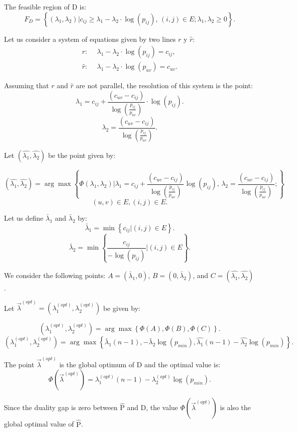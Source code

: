 The feasible region of $\mathrm{D}$ is:
\[F_{D}=\left\{(\lambda_{1},\lambda_{2})|c_{ij}\geq
\lambda_{1}-\lambda_{2}\cdot \log(p_{ij}),\, (i,j)\in E;
\lambda_{1},\lambda_{2}\geq 0 \right\}.\]

Let us consider a system of equations given by two lines $r$ y
$\hat{r}$:
\begin{align*}
  r:~        &~  \lambda_{1}-\lambda_{2}\cdot \log(p_{ij})=c_{ij}, \\
  \hat{r}:~  &~  \lambda_{1}-\lambda_{2}\cdot \log(p_{uv})=c_{uv}.
\end{align*}

Assuming that $r$ and $\hat{r}$ are not parallel, the resolution
of this system is the point:
\[\lambda_{1}=c_{ij}+\frac{(c_{uv}-c_{ij})}{\log(\frac{p_{ij}}{p_{uv}})}\cdot\log(p_{ij}).  \]
\[\lambda_{2}=\frac{(c_{uv}-c_{ij})}{\log(\frac{p_{ij}}{p_{uv}})}.  \]

Let $(\hat{\lambda_{1}},\hat{\lambda_{2}})$ be the point given by:

\[(\hat{\lambda_{1}},\hat{\lambda_{2}})=\arg\max\left\{\Phi(\lambda_{1},\lambda_{2})|\lambda_{1}=c_{ij}+\frac{(c_{uv}-c_{ij})}{\log(\frac{p_{ij}}{p_{uv}})}\log(p_{ij}),\,\lambda_{2}=\frac{(c_{uv}-c_{ij})}{\log(\frac{p_{ij}}{p_{uv}})};\right\}\]
\[(u,v)\in E, (i,j)\in E. \]

Let us define $\bar{\lambda}_{1}$ and $\bar{\lambda}_{2}$ by:
\[\bar{\lambda}_{1}=\min\left\{c_{ij}|(i,j)\in E \right\}. \]
\[\bar{\lambda}_{2}=\min\left\{\frac{c_{ij}}{-\log(p_{ij})}|(i,j)\in E \right\}. \]

We consider the following points: $A=(\bar{\lambda}_{1},0)$,
$B=(0,\bar{\lambda}_{2})$, and
$C=(\hat{\lambda_{1}},\hat{\lambda_{2}})$.

Let
$\vec{\lambda}^{(opt)}=(\lambda^{(opt)}_{1},\lambda^{(opt)}_{2})$
be given by:

\[(\lambda^{(opt)}_{1},\lambda^{(opt)}_{2})=\arg\max\left\{\Phi(A),\Phi(B),\Phi(C)\right\}. \]
\[(\lambda^{(opt)}_{1},\lambda^{(opt)}_{2})=\arg\max\left\{\bar{\lambda}_{1}(n-1),-\bar{\lambda}_{2}\log(p_{min}),\hat{\lambda_{1}}(n-1)-\hat{\lambda_{2}}\log(p_{min}) \right\}. \]

The point $\vec{\lambda}^{(opt)}$ is the global optimum of
$\mathrm{D}$ and the optimal value is:
\[\Phi(\vec{\lambda}^{(opt)})=\lambda^{(opt)}_{1}(n-1)-\lambda^{(opt)}_{2}\log(p_{min}).\]

Since the duality gap is zero between $\mathrm{\hat{P}}$ and
$\mathrm{D}$, the value $\Phi(\vec{\lambda}^{(opt)})$ is also the
global optimal value of $\mathrm{\hat{P}}$.

